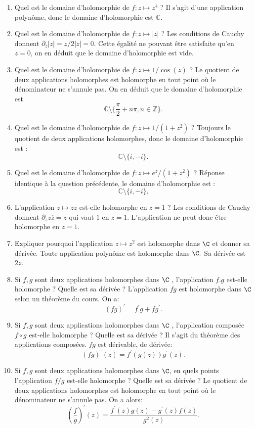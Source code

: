 \documentclass[a4paper, 12pt]{amsart}
\begin{document}
\begin{enumerate}
\item Quel est le domaine d'holomorphie de $f : z \mapsto z^4$ ?
Il s'agit d'une application polynôme, donc le domaine d'holomorphie est $\mathbb{C}$.
\item Quel est le domaine d'holomorphie de $f : z \mapsto |z|$ ?
Les conditions de Cauchy donnent $\partial_{\overline{z}}|z| = z / 2 |z| = 0$. Cette égalité ne pouvant être satisfaite qu'en $z=0$, 
on en déduit que le domaine d'holomorphie est vide.
\item Quel est le domaine d'holomorphie de $f : z \mapsto 1/ \cos(z)$ ?
Le quotient de deux applications holomorphes est holomorphe en tout point où le dénominateur ne s'annule pas. On en déduit que le domaine 
d'holomorphie est 
\[\mathbb{C} \setminus \{ \frac{\pi}{2} + n \pi, n \in \mathbb{Z}\} .\]
\item Quel est le domaine d'holomorphie de $f : z \mapsto 1/(1 + z^2 )$ ?
Toujours le quotient de deux applications holomorphes, donc le domaine d'holomorphie est :
\[
\mathbb{C} \setminus \{i, -i\}.
\]
\item Quel est le domaine d'holomorphie de $f : z \mapsto e^z /(1 + z^2 )$ ?
Réponse identique à la question précédente, le domaine d'holomorphie est :
\[
\mathbb{C} \setminus \{i, -i\}.
\]
\item L'application $z \mapsto z\overline{z}$ est-elle holomorphe en $z = 1$ ?
Les conditions de Cauchy donnent $\partial_{\overline{z}} z \overline{z} = z$ qui vaut $1$ en $z=1.$ L'application ne peut
donc être holomorphe en $z=1.$
\item Expliquer pourquoi l'application $z \mapsto z^2$ est holomorphe dans $\C$ et donner
sa dérivée.
Toute application polynôme est holomorphe dans $\C.$ Sa dérivée est $2z.$
\item Si $f, g$ sont deux applications holomorphes dans $\C$ , l'application $f.g$ est-elle
holomorphe ? Quelle est sa dérivée ?
L'application $fg$ est holomorphe dans $\C$ selon un théorème du cours. On a:
\[
\left( fg \right)^\prime = f^\prime g + f g^\prime.
\]
\item Si $f, g$ sont deux applications holomorphes dans $\C$ , l'application composée
$f \circ g$ est-elle holomorphe ? Quelle est sa dérivée ?
Il s'agit du théorème des applications composées. $fg$ est dérivable, de dérivée:
\[
(fg)^\prime(z) = f^\prime\left( g(z) \right) g^\prime(z).
\]
\item Si $f, g$ sont deux applications holomorphes dans $\C$, en quels points l'application $f /g$ est-elle holomorphe ? 
Quelle est sa dérivée ?
Le quotient de deux applications holomorphes est holomorphe en tout point où le dénominateur ne s'annule pas. On a alors:
\[
\left( \frac{f}{g} \right)^\prime(z) = \frac{f^\prime(z)g(z) - g^\prime(z)f(z)}{g^2(z)}.
\]
\end{enumerate}
\end{document}
